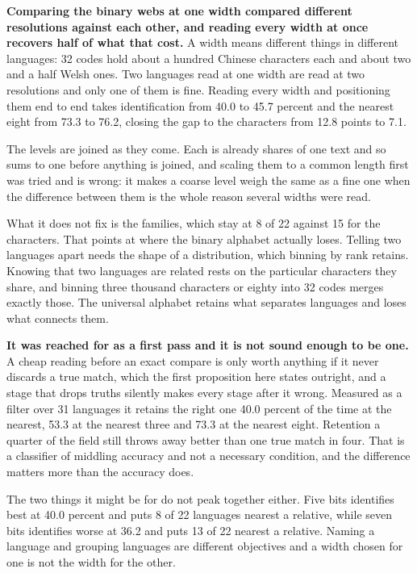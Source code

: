 \textbf{Comparing the binary webs at one width compared different resolutions against each other, and reading every width at once recovers half of what that cost.} A width means different things in different languages: 32 codes hold about a hundred Chinese characters each and about two and a half Welsh ones. Two languages read at one width are read at two resolutions and only one of them is fine. Reading every width and positioning them end to end takes identification from 40.0 to 45.7 percent and the nearest eight from 73.3 to 76.2, closing the gap to the characters from 12.8 points to 7.1.

The levels are joined as they come. Each is already shares of one text and so sums to one before anything is joined, and scaling them to a common length first was tried and is wrong: it makes a coarse level weigh the same as a fine one when the difference between them is the whole reason several widths were read.

What it does not fix is the families, which stay at 8 of 22 against 15 for the characters. That points at where the binary alphabet actually loses. Telling two languages apart needs the shape of a distribution, which binning by rank retains. Knowing that two languages are related rests on the particular characters they share, and binning three thousand characters or eighty into 32 codes merges exactly those. The universal alphabet retains what separates languages and loses what connects them.

\textbf{It was reached for as a first pass and it is not sound enough to be one.} A cheap reading before an exact compare is only worth anything if it never discards a true match, which the first proposition here states outright, and a stage that drops truths silently makes every stage after it wrong. Measured as a filter over 31 languages it retains the right one 40.0 percent of the time at the nearest, 53.3 at the nearest three and 73.3 at the nearest eight. Retention a quarter of the field still throws away better than one true match in four. That is a classifier of middling accuracy and not a necessary condition, and the difference matters more than the accuracy does.

The two things it might be for do not peak together either. Five bits identifies best at 40.0 percent and puts 8 of 22 languages nearest a relative, while seven bits identifies worse at 36.2 and puts 13 of 22 nearest a relative. Naming a language and grouping languages are different objectives and a width chosen for one is not the width for the other.

